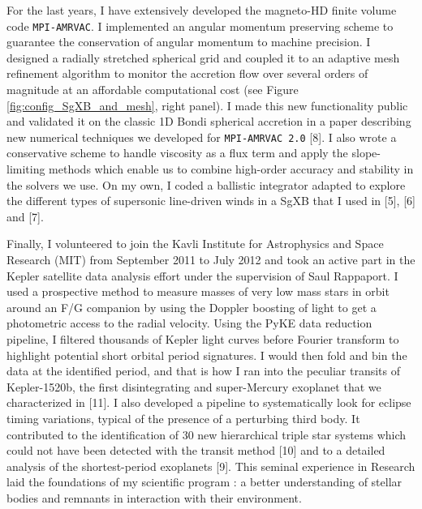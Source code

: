 \documentclass[letterpaper,12pt,onecolumn]{article}
\newcommand{\sgx}{SgXB\xspace}
\begin{document}
For the last years, I have extensively developed the magneto-HD finite volume code \texttt{MPI-AMRVAC}. I implemented an angular momentum preserving scheme to guarantee the conservation of angular momentum to machine precision. I designed a radially stretched spherical grid and coupled it to an adaptive mesh refinement algorithm to monitor the accretion flow over several orders of magnitude at an affordable computational cost (see Figure\,\ref{fig:config_SgXB_and_mesh}, right panel). I made this new functionality public and validated it on the classic 1D Bondi spherical accretion in a paper describing new numerical techniques we developed for \texttt{MPI-AMRVAC 2.0} [8]. I also wrote a conservative scheme to handle viscosity as a flux term and apply the slope-limiting methods which enable us to combine high-order accuracy and stability in the solvers we use. On my own, I coded a ballistic integrator adapted to explore the different types of supersonic line-driven winds in a \sgx that I used in [5], [6] and [7].


Finally, I volunteered to join the Kavli Institute for Astrophysics and Space Research (MIT) from September 2011 to July 2012 and took an active part in the Kepler satellite data analysis effort under the supervision of Saul Rappaport. I used a prospective method to measure masses of very low mass stars in orbit around an F/G companion by using the Doppler boosting of light to get a photometric access to the radial velocity. Using the PyKE data reduction pipeline, I filtered thousands of Kepler light curves before Fourier transform to highlight potential short orbital period signatures. I would then fold and bin the data at the identified period, and that is how I ran into the peculiar transits of Kepler-1520b, the first disintegrating and super-Mercury exoplanet that we characterized in [11]. I also developed a pipeline to systematically look for eclipse timing variations, typical of the presence of a perturbing third body. It contributed to the identification of 30 new hierarchical triple star systems which could not have been detected with the transit method [10] and to a detailed analysis of the shortest-period exoplanets [9]. This seminal experience in Research laid the foundations of my scientific program : a better understanding of stellar bodies and remnants in interaction with their environment.
\end{document}
